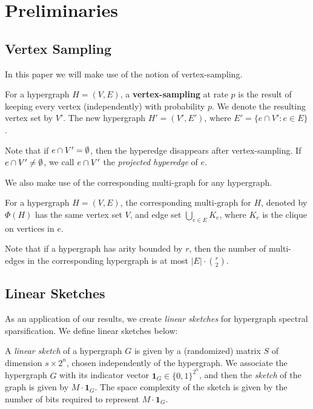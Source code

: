 \documentclass{article}
\begin{document}
\section{Preliminaries}\label{sec:preli}

\subsection{Vertex Sampling}

In this paper we will make use of the notion of vertex-sampling.

\begin{definition}
    For a hypergraph $H = (V, E)$, a \textbf{vertex-sampling} at rate $p$ is the result of keeping every vertex (independently) with probability $p$. We denote the resulting vertex set by $V'$. The new hypergraph $H' = (V', E')$, where $E' = \{e \cap V': e \in E \}$.
\end{definition}

Note that if $e\cap V' = \emptyset$, then the hyperedge disappears after
vertex-sampling. If $e \cap V'\neq \emptyset$, we call $e \cap V'$ the \textit{projected
hyperedge} of $e$.

We also make use of the corresponding multi-graph for any hypergraph.

\begin{definition}
    For a hypergraph $H = (V, E)$, the corresponding multi-graph for $H$, denoted by $\Phi(H)$ has the same vertex set $V$, and edge set $\bigcup_{e \in E} K_e$, where $K_e$ is the clique on vertices in $e$. 
\end{definition}

Note that if a hypergraph has arity bounded by $r$, then the number of multi-edges in the corresponding hypergraph is at most $|E| \cdot \binom{r}{2}$.

\subsection{Linear Sketches}

As an application of our results, we create \emph{linear sketches} for hypergraph spectral sparsification. We define linear sketches below:

\begin{definition}\label{def:graph-sketch}
    A \emph{linear sketch} of a hypergraph $G$ is given by a (randomized) matrix $S$ of dimension $s \times {2^n}$, chosen independently of the hypergraph. We associate the hypergraph $G$ with its indicator vector
    $\mathbf{1}_G \in\{0,1\}^{2^n}$, and then the \emph{sketch} of the graph is given by $M \cdot \mathbf{1}_G$. The space complexity of the sketch is given by the number of bits required to represent $M \cdot \mathbf{1}_G$.
\end{definition}
\end{document}
